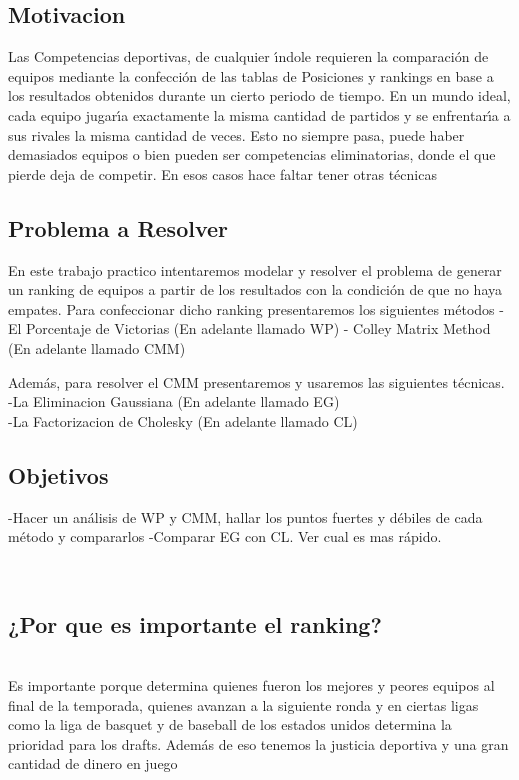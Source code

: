 \subsection{Motivacion}

Las Competencias deportivas, de cualquier \'\i{ndole} requieren la comparación de equipos
mediante la confección de las tablas de Posiciones y rankings en base a los resultados obtenidos
durante un cierto periodo de tiempo.
En un mundo ideal, cada equipo jugar\'\i{a} exactamente la misma cantidad de partidos y se enfrentar\'\i{a} a sus rivales
la misma cantidad de veces. Esto no siempre pasa, puede haber demasiados equipos o bien pueden ser competencias
eliminatorias, donde el que pierde deja de competir. En esos casos hace faltar tener otras técnicas  

\newline
\subsection{Problema a Resolver}
En este trabajo practico intentaremos modelar y 
resolver el problema de generar un ranking de equipos a partir de los 
resultados con la condición de que no haya empates. 
Para confeccionar dicho ranking presentaremos los siguientes métodos
\newline
- El Porcentaje de Victorias (En adelante llamado WP)
\newline
- Colley Matrix Method (En adelante llamado CMM)


Además, para resolver el CMM presentaremos y usaremos las siguientes técnicas.\\
-La Eliminacion Gaussiana (En adelante llamado EG)\\
-La Factorizacion de Cholesky (En adelante llamado CL)  


\subsection{Objetivos}
-Hacer un análisis de WP y CMM, hallar los puntos fuertes y débiles de cada método y compararlos 
-Comparar EG con CL. Ver cual es mas rápido. 

\\
\subsection{¿Por que es importante el ranking?} 
\\
Es importante porque determina quienes fueron los mejores y peores equipos al final
de la temporada, quienes avanzan a la siguiente ronda y en ciertas
ligas como la liga de basquet y de baseball de los estados unidos 
determina la prioridad para los drafts.
Además de eso tenemos la justicia deportiva y una gran cantidad de dinero en juego

